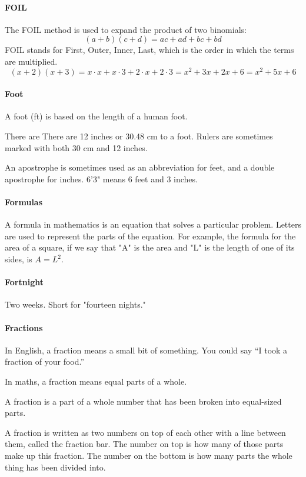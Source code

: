 \documentclass[12pt]{article}
\begin{document}
\paragraph{FOIL}
The FOIL method is used to expand the product of two binomials:
\[
(a + b)(c + d) = ac + ad + bc + bd
\]
FOIL stands for First, Outer, Inner, Last, which is the order in which the terms are multiplied.
\[(x + 2)(x + 3) = x \cdot x + x \cdot 3 + 2 \cdot x + 2 \cdot 3 = x^2 + 3x + 2x + 6 = x^2 + 5x + 6\]

\paragraph{Foot}
A foot (ft) is based on the length of a human foot.

There are There are 12 inches or 30.48 cm to a foot. Rulers are sometimes marked with both 30 cm and 12 inches.

An apostrophe is sometimes used as an abbreviation for feet, and a double apostrophe for inches. 6'3" means 6 feet and 3 inches.

\paragraph{Formulas}
A formula in mathematics is an equation that solves a particular problem. Letters are used to represent the parts of the equation. For example, the formula for the area of a square, if we say that "A" is the area and "L" is the length of one of its sides, is $A = L^2$.\\

\paragraph{Fortnight}
Two weeks. Short for "fourteen nights."

\paragraph{Fractions}
In English, a fraction means a small bit of something. You could say “I took a fraction of your food.”

In maths, a fraction means equal parts of a whole.

A fraction is a part of a whole number that has been broken into equal-sized parts.

A fraction is written as two numbers on top of each other with a line between them, called the fraction bar. The number on top is how many of those parts make up this fraction. The number on the bottom is how many parts the whole thing has been divided into.
\end{document}
